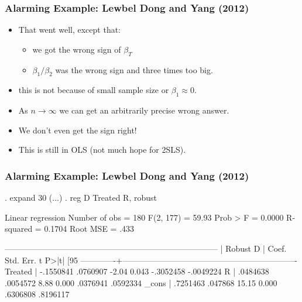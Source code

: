 \documentclass[aspectratio=169]{beamer}
\begin{document}
\begin{frame}[fragile]
\frametitle{Alarming Example: Lewbel Dong and Yang (2012)}
\begin{itemize}
\item That went well, except that:
\begin{itemize}
\item we got the wrong sign of $\beta_T$
\item $\beta_1/\beta_2$ was the wrong sign and three times too big.
\end{itemize}
\item this is not because of small sample size or $\beta_1 \approx 0$.
\item As $n \rightarrow \infty$ we can get an arbitrarily precise wrong answer.
\item We don't even get the sign right!
\item This is still in OLS (not much hope for 2SLS).
\end{itemize}
\end{frame}

\begin{frame}[fragile]
\frametitle{Alarming Example: Lewbel Dong and Yang (2012)}
\tiny
\begin{semiverbatim}
. expand 30
(...)
. reg D Treated R, robust

Linear regression                               Number of obs     =        180
                                                F(2, 177)         =      59.93
                                                Prob > F          =     0.0000
                                                R-squared         =     0.1704
                                                Root MSE          =       .433

------------------------------------------------------------------------------
             |               Robust
           D |      Coef.   Std. Err.      t    P>|t|     [95%
-------------+----------------------------------------------------------------
     Treated |  -.1550841   .0760907    -2.04   0.043    -.3052458   -.0049224
           R |   .0484638   .0054572     8.88   0.000     .0376941    .0592334
       _cons |   .7251463    .047868    15.15   0.000     .6306808    .8196117
\end{semiverbatim}
\end{frame}
\end{document}
